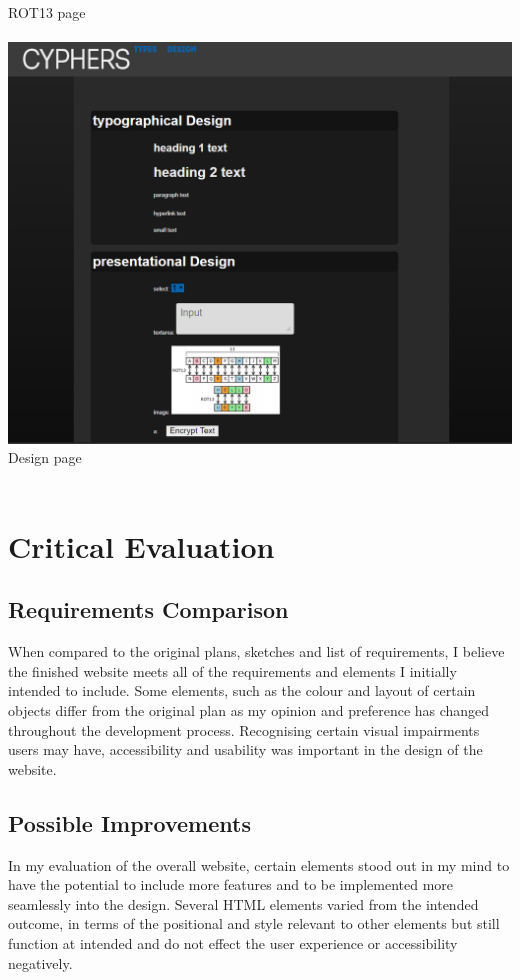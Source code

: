 \documentclass[10pt, a4paper]{article}
\begin{document}
	ROT13 page
	\\\\
	\includegraphics[scale=0.28]{design}
	Design page
	\\\\
	
	\section{Critical Evaluation}
    
	\subsection{Requirements Comparison}
	    When compared to the original plans, sketches and list of requirements, I believe the finished website meets all of the requirements and elements I initially intended to include. Some elements, such as the colour and layout of certain objects differ from the original plan as my opinion and preference has changed throughout the development process. Recognising certain visual impairments users may have, accessibility and usability was important in the design of the website.

	\subsection{Possible Improvements}
	In my evaluation of the overall website, certain elements stood out in my mind to have the potential to include more features and to be implemented more seamlessly into the design. Several HTML elements varied from the intended outcome, in terms of the positional and style relevant to other elements but still function at intended and do not effect the user experience or accessibility negatively. 
	
\end{document}
